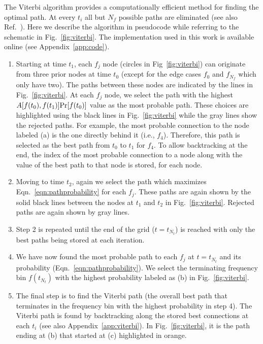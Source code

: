 \documentclass[paper-main.tex]{subfiles}
\begin{document}
The Viterbi algorithm provides a computationally efficient method for finding the optimal path. 
At every $t_i$ all but $N_f$ possible paths are eliminated (see also Ref.~\cite{ScoX1ViterbiO1:2017}). 
Here we describe the algorithm in pseudocode while referring to the schematic in Fig.~\ref{fig:viterbi}. %
The implementation used in this work is available online (see Appendix~\ref{app:code}).
\begin{enumerate}
\item Starting at time $t_1$, each $f_j$ node (circles in Fig~\ref{fig:viterbi}) can originate from three prior nodes at time $t_0$ (except for the edge cases $f_0$ and $f_{N_f}$ which only have two). 
The paths between these nodes are indicated by the lines in Fig.~\ref{fig:viterbi}. 
At each $f_j$ node, we select the path with the highest $A[f(t_0),f(t_1)] {\rm Pr}[f(t_0)]$ value as the most probable path. 
These choices are highlighted using the black lines in Fig.~\ref{fig:viterbi} while the gray lines show the rejected paths. 
For example, the most probable connection to the node labeled (a) is the one directly behind it (i.e., $f_4$). 
Therefore, this path is selected as the best path from $t_0$ to $t_1$ for $f_4$.
To allow backtracking at the end, the index of the most probable connection to a node along with the value of the best path to that node is stored, for each node.

\item Moving to time $t_2$, again we select the path which maximizes Eqn.~\ref{eqn:pathprobability} for each $f_j$. 
These paths are again shown by the solid black lines between the nodes at $t_1$ and $t_2$ in Fig.~\ref{fig:viterbi}.
Rejected paths are again shown by gray lines. 

\item Step 2 is repeated until the end of the grid ($t=t_{N_t}$) is reached with only the best paths being stored at each iteration. 

\item We have now found the most probable path to each $f_j$ at $t=t_{N_t}$ and its probability (Eqn.~\ref{eqn:pathprobability}). 
We select the terminating frequency bin $f(t_{N_t})$ with the highest probability labeled as (b) in Fig.~\ref{fig:viterbi}.

\item The final step is to find the Viterbi path (the overall best path that terminates in the frequency bin with the highest probability in step 4). 
The Viterbi path is found by backtracking along the stored best connections at each $t_i$ (see also Appendix~\ref{app:viterbi}). 
In Fig.~\ref{fig:viterbi}, it is the path ending at (b) that started at (c) highlighted in orange.
\end{enumerate}
\end{document}

